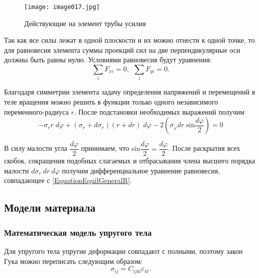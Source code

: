 \documentclass[a4paper,14pt]{extarticle}
\begin{document}
\begin{figure}[ht]
\begin{center}
\texttt{[image: image017.jpg]}
\caption{Действующие на элемент трубы усилия}
\end{center}
\end{figure}

\newpage

Так как все силы лежат в одной плоскости и их можно отнести к одной точке, то для равновесия элемента суммы проекций сил на две перпендикулярные оси должны быть равны нулю. Условиями равновесия будут уравнения:
\[
\sum\limits_i {F_{xi}}=0, \ \  \sum\limits_i {F_{yi}}=0.
\]

Благодаря симметрии элемента задачу определения напряжений и перемещений в теле вращения можно решить в функции только одного независимого переменного-радиуса $r$. После подстановки необходимых выражений получим 
\[
-\sigma_{r}r\;d\varphi+(\sigma_{r}+d\sigma_r)(r+dr)\;d\varphi-2(\sigma_{\varphi}dr\;\text{sin}\frac{d\varphi}{2})=0
\]

В силу малости угла $\dfrac{d\varphi}{2}$ принимаем, что sin$\dfrac{d\varphi}{2}=\dfrac{d\varphi}{2}$. После раскрытия всех скобок, сокращения подобных слагаемых и отбрасывания члена высшего порядка малости $d\sigma_{r}\:dr\:d\varphi$ получим дифференциальное уравнение равновесия, совпадающее с \eqref{EquationEquilGeneralR}.

\newpage

\subsection{Модели материала}

\subsubsection{Математическая модель упругого тела}

Для упругого тела упругие деформации совпадают с полными, поэтому закон Гука можно переписать следующим образом:
\begin{equation}\label{GukElastic}
\sigma_{ij}=C_{ijkl}\varepsilon_{kl}.
\end{equation}
\end{document}
